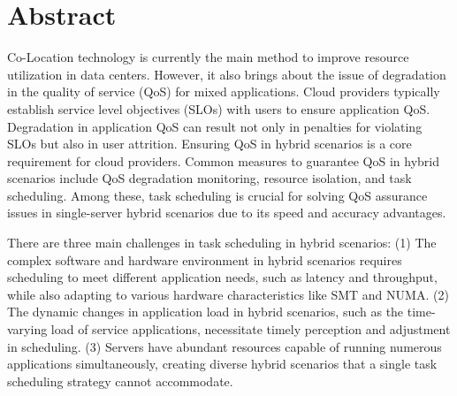 \intobmk\chapter*{Abstract}%

Co-Location technology is currently the main method to improve resource utilization in data centers. However, it also brings about the issue of degradation in the quality of service (QoS) for mixed applications. Cloud providers typically establish service level objectives (SLOs) with users to ensure application QoS. Degradation in application QoS can result not only in penalties for violating SLOs but also in user attrition. Ensuring QoS in hybrid scenarios is a core requirement for cloud providers. Common measures to guarantee QoS in hybrid scenarios include QoS degradation monitoring, resource isolation, and task scheduling. Among these, task scheduling is crucial for solving QoS assurance issues in single-server hybrid scenarios due to its speed and accuracy advantages.

There are three main challenges in task scheduling in hybrid scenarios: (1) The complex software and hardware environment in hybrid scenarios requires scheduling to meet different application needs, such as latency and throughput, while also adapting to various hardware characteristics like SMT and NUMA. (2) The dynamic changes in application load in hybrid scenarios, such as the time-varying load of service applications, necessitate timely perception and adjustment in scheduling. (3) Servers have abundant resources capable of running numerous applications simultaneously, creating diverse hybrid scenarios that a single task scheduling strategy cannot accommodate.

